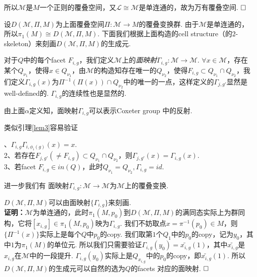 \documentclass{article}
\theoremstyle{plain}%
\theoremstyle{definition}
\theoremstyle{remark}
\begin{document}
{所以$\mathcal{M}$是$M$一个正则的覆叠空间，又$\mathcal{L}\cong \mathcal{M}$是单连通的，故为万有覆叠空间.
$\hfill{} \Box$

设$D(\mathcal{M},\Pi,M)$为上面覆叠空间$\Pi: \mathcal{M}\longrightarrow M$的覆叠变换群. 由于$\mathcal{M}$是单连通的，所以$\pi_1(M)\cong D(\mathcal{M},\Pi,M)$. 
下面我们根据上面构造的cell structure（的$2$-skeleton）来刻画$D(\mathcal{M},\Pi,M)$的生成元. 

对于$Q$中的每个facet $F_{i,g}$，我们定义$\mathcal{M}$上的{\em 面映射}$\Gamma_{i,g}:\mathcal{M}\longrightarrow \mathcal{M}$. $\forall x\in \mathcal{M}$，存在某个$Q_{\nu_1}$，使得$x\in Q_{\nu_1}$，由$\mathcal{M}$的构造知存在唯一的$Q_{\nu_2}$，使得$F_{i,g}\subset Q_{\nu_1}\cap Q_{\nu_2}$，我们定义$\Gamma_{i,g}(x)$为$\Pi^{-1}(\Pi(x))\cap Q_{\nu_2}$中的唯一的一点，这样定义的$\Gamma_{j,g'}$显然是well-defined的. $\Gamma_{i,g}$的连续性也是显然的.

{\rem 由上面$\alpha$定义知，面映射$\Gamma_{i,g}$可以表示Coxeter group 中的反射.}

类似引理\ref{lem3}容易验证

{、$\Gamma_{i,g}\Gamma_{i,\phi_i(g)}(x)=x$. \\
2、若存在$F_{j,g'}(\neq F_{i,g})\subset Q_{\nu_1}\cap Q_{\nu_2}$，则$\Gamma_{j,g'}(x)=\Gamma_{i,g}(x)$. \\
3、若facet $F_{i,g}\in in(Q)$，此时$Q_{\nu_1}=Q_{\nu_2},\Gamma_{i,g}=id.$}

进一步我们有
{\lem 面映射$\Gamma_{i,g}:\mathcal{M}\longrightarrow \mathcal{M}$为$\mathcal{M}$上的覆叠变换.
}

{\prop $D(\mathcal{M},\Pi,M)$可以由面映射$\{\Gamma_{i,g}\}$来刻画.}\\
{\bf 证明：}$\mathcal{M}$为单连通的，此时$\pi_1(M,p_0)$到$D(\mathcal{M},\Pi,M)$的满同态实际上为群同构，它将$[x_{i,g}]\in \pi_1(M,p_0)$映为$\Gamma_{i,g}$. 
我们不妨取点$x=\pi^{-1}(p_0)\in M$，则$\{\Pi^{-1}(x)\}$实际上是每个$Q$中$p_0$的copy. 我们取第$1$个$Q_1$中的$p_0$的copy，记为$y_0$，其中$1$为$\pi_1(M)$的单位元. 所以我们只需要验证$\Gamma_{i,g}(y_0)=\widetilde{x_{i,g}}(1)$，其中$\widetilde{x_{i,g}}$是$x_{i,g}$在$\mathcal{M}$中的一段提升.
$\Gamma_{i,g}(y_0)$实际上是$Q_{x_{i,g}}$中的$p_0$的copy，即$\widetilde{x_{i,g}}(1)$. 所以$D(\mathcal{M},\Pi,M)$的生成元可以自然的选为$Q$的facets 对应的面映射.  $\hfill{} \Box$

}
\end{document}
